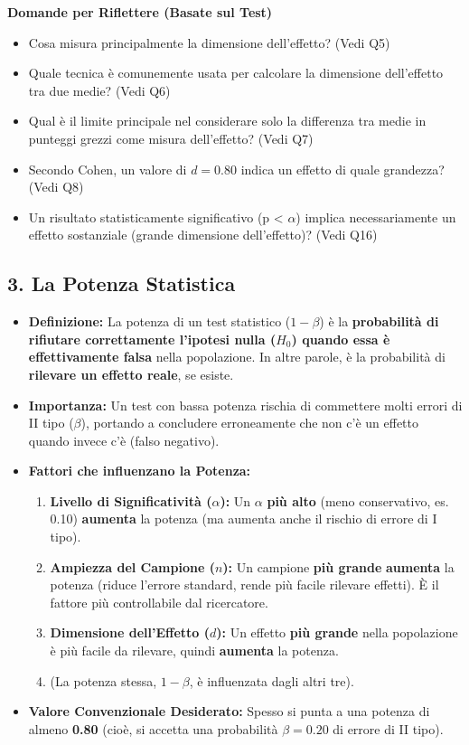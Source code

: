 \documentclass[12pt, a4paper]{article}
\newenvironment{reflectionbox}{%
    \medskip
    \begin{framed}\par\noindent
    \textbf{\color{boxtitlecolor}Domande per Riflettere (Basate sul Test)} \par
    \begin{itemize}[leftmargin=*, label=$\blacktriangleright$]
}{%
    \end{itemize}\par
    \end{framed}
    \medskip
}
\newcommand{\alphaerr}{\alpha} %
\newcommand{\betaerr}{\beta}  %
\newcommand{\Hnull}{H_0} %
\newcommand{\cohend}{d} %
\begin{document}
\begin{reflectionbox}
    \item Cosa misura principalmente la dimensione dell'effetto? (Vedi Q5)
    \item Quale tecnica è comunemente usata per calcolare la dimensione dell'effetto tra due medie? (Vedi Q6)
    \item Qual è il limite principale nel considerare solo la differenza tra medie in punteggi grezzi come misura dell'effetto? (Vedi Q7)
    \item Secondo Cohen, un valore di $d = 0.80$ indica un effetto di quale grandezza? (Vedi Q8)
    \item Un risultato statisticamente significativo (p < $\alphaerr$) implica necessariamente un effetto sostanziale (grande dimensione dell'effetto)? (Vedi Q16)
\end{reflectionbox}

\subsection*{3. La Potenza Statistica}
\begin{itemize}
    \item \textbf{Definizione:} La potenza di un test statistico ($1-\betaerr$) è la \textbf{probabilità di rifiutare correttamente l'ipotesi nulla ($\Hnull$) quando essa è effettivamente falsa} nella popolazione. In altre parole, è la probabilità di \textbf{rilevare un effetto reale}, se esiste.
    \item \textbf{Importanza:} Un test con bassa potenza rischia di commettere molti errori di II tipo ($\betaerr$), portando a concludere erroneamente che non c'è un effetto quando invece c'è (falso negativo).
    \item \textbf{Fattori che influenzano la Potenza:}
        \begin{enumerate}
            \item \textbf{Livello di Significatività ($\alphaerr$):} Un $\alphaerr$ \textbf{più alto} (meno conservativo, es. 0.10) \textbf{aumenta} la potenza (ma aumenta anche il rischio di errore di I tipo).
            \item \textbf{Ampiezza del Campione ($n$):} Un campione \textbf{più grande} \textbf{aumenta} la potenza (riduce l'errore standard, rende più facile rilevare effetti). È il fattore più controllabile dal ricercatore.
            \item \textbf{Dimensione dell'Effetto ($\cohend$):} Un effetto \textbf{più grande} nella popolazione è più facile da rilevare, quindi \textbf{aumenta} la potenza.
            \item (La potenza stessa, $1-\betaerr$, è influenzata dagli altri tre).
        \end{enumerate}
    \item \textbf{Valore Convenzionale Desiderato:} Spesso si punta a una potenza di almeno \textbf{0.80} (cioè, si accetta una probabilità $\betaerr = 0.20$ di errore di II tipo).
\end{itemize}
\end{document}
